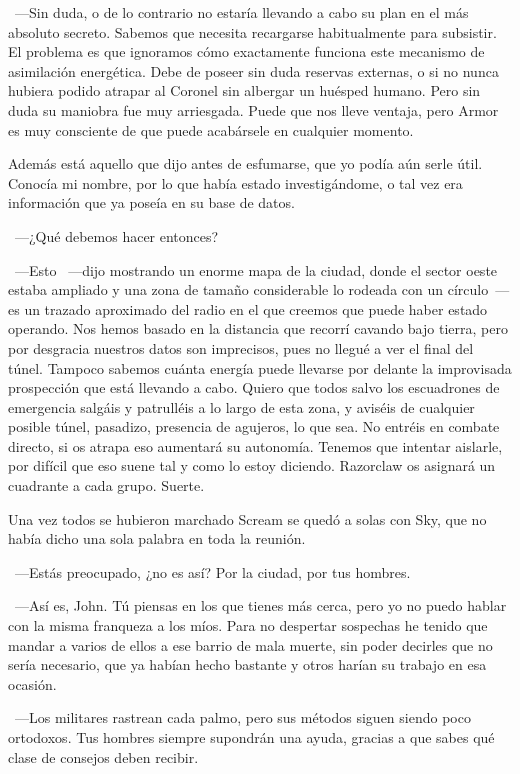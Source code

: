 ~---Sin duda, o de lo contrario no estaría llevando a cabo su plan en el más absoluto secreto. Sabemos que necesita recargarse habitualmente para subsistir. El problema es que ignoramos cómo exactamente funciona este mecanismo de asimilación energética. Debe de poseer sin duda reservas externas, o si no nunca hubiera podido atrapar al Coronel sin albergar un huésped humano. Pero sin duda su maniobra fue muy arriesgada. Puede que nos lleve ventaja, pero Armor es muy consciente de que puede acabársele en cualquier momento.

\rquoti Además está aquello que dijo antes de esfumarse, que yo podía aún serle útil. Conocía mi nombre, por lo que había estado investigándome, o tal vez era información que ya poseía en su base de datos.

~---¿Qué debemos hacer entonces?

~---Esto ~---dijo mostrando un enorme mapa de la ciudad, donde el sector oeste estaba ampliado y una zona de tamaño considerable lo rodeada con un círculo~--- es un trazado aproximado del radio en el que creemos que puede haber estado operando. Nos hemos basado en la distancia que recorrí cavando bajo tierra, pero por desgracia nuestros datos son imprecisos, pues no llegué a ver el final del túnel. Tampoco sabemos cuánta energía puede llevarse por delante la improvisada prospección que está llevando a cabo. Quiero que todos salvo los escuadrones de emergencia salgáis y patrulléis a lo largo de esta zona, y aviséis de cualquier posible túnel, pasadizo, presencia de agujeros, lo que sea. No entréis en combate directo, si os atrapa eso aumentará su autonomía. Tenemos que intentar aislarle, por difícil que eso suene tal y como lo estoy diciendo. Razorclaw os asignará un cuadrante a cada grupo. Suerte.

Una vez todos se hubieron marchado Scream se quedó a solas con Sky, que no había dicho una sola palabra en toda la reunión.

~---Estás preocupado, ¿no es así? Por la ciudad, por tus hombres.

~---Así es, John. Tú piensas en los que tienes más cerca, pero yo no puedo hablar con la misma franqueza a los míos. Para no despertar sospechas he tenido que mandar a varios de ellos a ese barrio de mala muerte, sin poder decirles que no sería necesario, que ya habían hecho bastante y otros harían su trabajo en esa ocasión.

~---Los militares rastrean cada palmo, pero sus métodos siguen siendo poco ortodoxos. Tus hombres siempre supondrán una ayuda, gracias a que sabes qué clase de consejos deben recibir.

